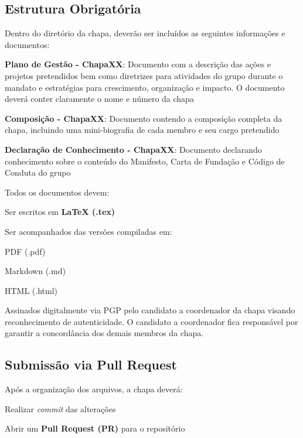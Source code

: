 \documentclass[
  12pt,          %
  a4paper,       %
  oneside,       %
  brazil         %
]{article}
\begin{document}
\subsection{Estrutura Obrigatória}

Dentro do diretório da chapa, deverão ser incluídos as seguintes informações e documentos:

\begin{conduta}
	\item \textbf{Plano de Gestão - ChapaXX}: Documento com a descrição das ações e projetos pretendidos bem como diretrizes para atividades do grupo 
	durante o mandato e estratégias para crescimento, organização e impacto. O documento deverá conter claramente o nome e número da chapa 
	\item \textbf{Composição - ChapaXX}: Documento contendo a composição completa da chapa, incluindo uma mini-biografia de cada membro e seu cargo pretendido 
	\item \textbf{Declaração de Conhecimento - ChapaXX}: Documento declarando conhecimento sobre o conteúdo do Manifesto, Carta de Fundação e Código de Conduta do grupo
	
\end{conduta}

Todos os documentos devem:

\begin{conduta}
	\item Ser escritos em \textbf{LaTeX (.tex)}
	\item Ser acompanhados das versões compiladas em:
	\begin{conduta}
		\item PDF (.pdf)
		\item Markdown (.md)
		\item HTML (.html)
	\item Assinados digitalmente via PGP pelo candidato a coordenador da chapa visando reconhecimento de autenticidade. O candidato a coordenador fica responsável por garantir a concordância dos demais membros da chapa.
	\end{conduta}
\end{conduta}

\subsection{Submissão via Pull Request}

Após a organização dos arquivos, a chapa deverá:

\begin{numerado}
	\item Realizar \textit{commit} das alterações
	\item Abrir um \textbf{Pull Request (PR)} para o repositório
\end{numerado}
\end{document}
